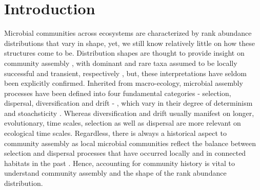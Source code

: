 \documentclass[12pt,a4paper]{article} %
\begin{document}
\section*{Introduction}
Microbial communities across ecosystems are characterized by rank abundance distributions that vary in shape, yet, we still know relatively little on how these structures come to be. Distribution shapes are thought to provide insight on community assembly \citep{McGill2007}, with dominant and rare taxa assumed to be locally successful and transient, respectively \citep{Magurran2003, Nakadai2020}, but, these interpretations have seldom been explicitly confirmed. Inherited from macro-ecology, microbial assembly processes have been defined into four fundamental categories - selection, dispersal, diversification and drift - \citep{Vellend2010}, which vary in their degree of determinism and stoachsticity \citep{Zhou2017}. Whereas diversification and drift usually manifest on longer, evolutionary, time scales, selection as well as dispersal are more relevant on ecological time scales. Regardless, there is always a historical aspect to community assembly as local microbial communities reflect the balance between selection and dispersal processes that have occurred locally and in connected habitats in the past \citep{Fukami2004}. Hence, accounting for community history is vital to understand community assembly and the shape of the rank abundance distribution.
\end{document}
